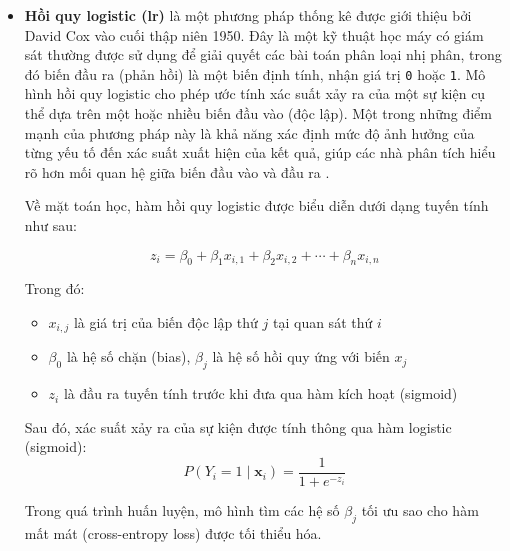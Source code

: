 \begin{itemize}
Việc kết hợp nhiều cây giúp \ac{rf} giảm thiểu hiện tượng quá khớp (\textit{overfitting}) vốn là một nhược điểm thường gặp của các cây quyết định đơn lẻ. Khi số lượng cây trong rừng tăng lên, hiệu năng dự đoán của mô hình có xu hướng ổn định và cải thiện hơn.
\item \textbf{Hồi quy logistic (\ac{lr})} là một phương pháp thống kê được giới thiệu bởi David Cox vào cuối thập niên 1950. Đây là một kỹ thuật học máy có giám sát thường được sử dụng để giải quyết các bài toán phân loại nhị phân, trong đó biến đầu ra (phản hồi) là một biến định tính, nhận giá trị \texttt{0} hoặc \texttt{1}. Mô hình hồi quy logistic cho phép ước tính xác suất xảy ra của một sự kiện cụ thể dựa trên một hoặc nhiều biến đầu vào (độc lập). Một trong những điểm mạnh của phương pháp này là khả năng xác định mức độ ảnh hưởng của từng yếu tố đến xác suất xuất hiện của kết quả, giúp các nhà phân tích hiểu rõ hơn mối quan hệ giữa biến đầu vào và đầu ra \cite{cox1958regression}.

Về mặt toán học, hàm hồi quy logistic được biểu diễn dưới dạng tuyến tính như sau:

\begin{equation}
z_i = \beta_0 + \beta_1 x_{i,1} + \beta_2 x_{i,2} + \cdots + \beta_n x_{i,n}
\label{eq:linear_combination}
\end{equation}

Trong đó:
\begin{itemize}
    \item $x_{i,j}$ là giá trị của biến độc lập thứ $j$ tại quan sát thứ $i$
    \item $\beta_0$ là hệ số chặn (bias), $\beta_j$ là hệ số hồi quy ứng với biến $x_j$
    \item $z_i$ là đầu ra tuyến tính trước khi đưa qua hàm kích hoạt (sigmoid)
\end{itemize}

Sau đó, xác suất xảy ra của sự kiện được tính thông qua hàm logistic (sigmoid):
\begin{equation}
P(Y_i = 1 \mid \mathbf{x}_i) = \frac{1}{1 + e^{-z_i}}
\label{eq:sigmoid}
\end{equation}

Trong quá trình huấn luyện, mô hình tìm các hệ số $\beta_j$ tối ưu sao cho hàm mất mát (cross-entropy loss) được tối thiểu hóa.


\end{itemize}
